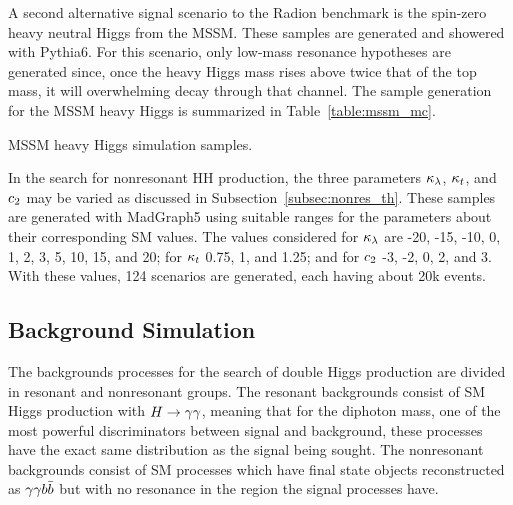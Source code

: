 A second alternative signal scenario to the Radion benchmark is the spin-zero heavy neutral Higgs from
the MSSM. These samples are generated and showered with Pythia6. For this scenario, only low-mass
resonance hypotheses are generated since, once the heavy Higgs mass rises above twice that of the top
mass, it will overwhelming decay through that channel. The sample generation for the MSSM heavy
Higgs is summarized in Table~\ref{table:mssm_mc}.

\begin{table}[ht]
  \centering
  \renewcommand{\arraystretch}{1.4}
  \caption{MSSM heavy Higgs simulation samples.}
  
  \label{table:mssm_mc}
\end{table}

In the search for nonresonant HH production, the three parameters $\kappa_{\lambda}$, $\kappa_{t}$, and $c_2$
may be varied as discussed in Subsection~\ref{subsec:nonres_th}. These samples are generated
with MadGraph5 using suitable ranges for the parameters about their corresponding SM values. The
values considered for $\kappa_{\lambda}$ are -20, -15, -10, 0, 1, 2, 3, 5, 10, 15, and 20; for $\kappa_{t}$ 0.75, 1, and 1.25; and for $c_2$ -3, -2, 0, 2, and 3.
With these values, 124 scenarios are generated, each having about 20k events.

\subsection{Background Simulation\label{subsec:bkg_samples}}

The backgrounds processes for the search of double Higgs production are divided in resonant and
nonresonant groups. The resonant backgrounds consist of SM Higgs production with $H\to\gamma\gamma$, meaning
that for the diphoton mass, one of the most powerful discriminators between signal and background,
these processes have the exact same distribution as the signal being sought. The nonresonant backgrounds
consist of SM processes which have final state objects reconstructed as $\gamma\gamma b\bar{b}$ but with no resonance
in the region the signal processes have.

